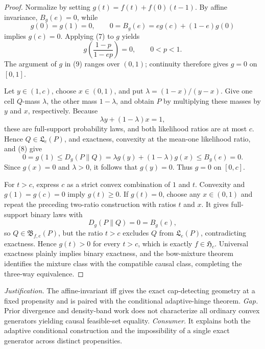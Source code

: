 \documentclass{article}
\begin{document}
\begin{proof}
Normalize by setting \(g(t)=f(t)+f(0)(t-1)\).  By affine invariance, \(B_g(e)=0\), while
\[
 g(0)=g(1)=0,
 \qquad
 0=B_g(e)=eg(c)+(1-e)g(0)
\]
implies \(g(c)=0\).  Applying (7) to \(g\) yields
\[
 g\!\left(\frac{1-p}{1-ep}\right)=0,\qquad 0<p<1. \tag{9}
\]
The argument of \(g\) in (9) ranges over \((0,1)\); continuity therefore gives \(g=0\) on \([0,1]\).

Let \(y\in(1,c)\), choose \(x\in(0,1)\), and put \(\lambda=(1-x)/(y-x)\).  Give one cell \(Q\)-mass \(\lambda\), the other mass \(1-\lambda\), and obtain \(P\) by multiplying these masses by \(y\) and \(x\), respectively.  Because
\[
 \lambda y+(1-\lambda)x=1,
\]
these are full-support probability laws, and both likelihood ratios are at most \(c\).  Hence \(Q\in\mathfrak L_e(P)\), and exactness, convexity at the mean-one likelihood ratio, and (8) give
\[
 0=g(1)\le D_g(P\|Q)
   =\lambda g(y)+(1-\lambda)g(x)\le B_g(e)=0.
\]
Since \(g(x)=0\) and \(\lambda>0\), it follows that \(g(y)=0\).  Thus \(g=0\) on \([0,c]\).

For \(t>c\), express \(c\) as a strict convex combination of \(1\) and \(t\).  Convexity and \(g(1)=g(c)=0\) imply \(g(t)\ge0\).  If \(g(t)=0\), choose any \(x\in(0,1)\) and repeat the preceding two-ratio construction with ratios \(t\) and \(x\).  It gives full-support binary laws with
\[
 D_g(P\|Q)=0=B_g(e),
\]
so \(Q\in\mathfrak B_{f,e}(P)\), but the ratio \(t>c\) excludes \(Q\) from \(\mathfrak L_e(P)\), contradicting exactness.  Hence \(g(t)>0\) for every \(t>c\), which is exactly \(f\in\mathfrak H_c\).  Universal exactness plainly implies binary exactness, and the bow-mixture theorem identifies the mixture class with the compatible causal class, completing the three-way equivalence.
\end{proof}
\par\smallskip\noindent \textit{Justification.} The affine-invariant iff gives the exact cap-detecting geometry at a fixed propensity and is paired with the conditional adaptive-hinge theorem. \textit{Gap.} Prior divergence and density-band work does not characterize all ordinary convex generators yielding causal feasible-set equality. \textit{Consumer.} It explains both the adaptive conditional construction and the impossibility of a single exact generator across distinct propensities.
\end{document}
